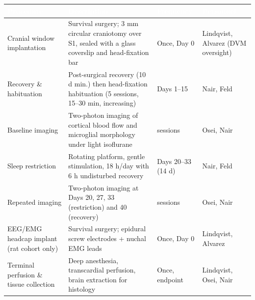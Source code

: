 

\noindent
\begin{tabularx}{\linewidth}{@{}
  >{\small}p{2.6cm}
  >{\small}X
  >{\small\centering\arraybackslash}p{2.0cm}
  >{\small}p{3.0cm}
  @{}}
\toprule
\rowcolor{ProtocolNavy}
\textcolor{white}{\textbf{Procedure}} &
\textcolor{white}{\textbf{Description}} &
\textcolor{white}{\textbf{Frequency}} &
\textcolor{white}{\textbf{Personnel}} \\
\midrule
Cranial window implantation & Survival surgery; 3 mm circular craniotomy over S1, sealed with
  a glass coverslip and head-fixation bar & Once, Day 0 & Lindqvist, Alvarez (DVM oversight) \\
\rowcolor{LightFog}
Recovery \& habituation & Post-surgical recovery (10 d min.) then head-fixation habituation
  (5 sessions, 15--30 min, increasing) & Days 1--15 & Nair, Feld \\
Baseline imaging & Two-photon imaging of cortical blood flow and microglial morphology
  under light isoflurane & 2 sessions & Osei, Nair \\
\rowcolor{LightFog}
Sleep restriction & Rotating platform, gentle stimulation, 18 h/day with 6 h undisturbed
  recovery & Days 20--33 (14 d) & Nair, Feld \\
Repeated imaging & Two-photon imaging at Days 20, 27, 33 (restriction) and 40 (recovery)
  & 4 sessions & Osei, Nair \\
\rowcolor{LightFog}
EEG/EMG headcap implant (rat cohort only) & Survival surgery; epidural screw electrodes +
  nuchal EMG leads & Once, Day 0 & Lindqvist, Alvarez \\
Terminal perfusion \& tissue collection & Deep anesthesia, transcardial perfusion,
  brain extraction for histology & Once, endpoint & Lindqvist, Osei, Nair \\
\bottomrule
\end{tabularx}

\vspace{8pt}

